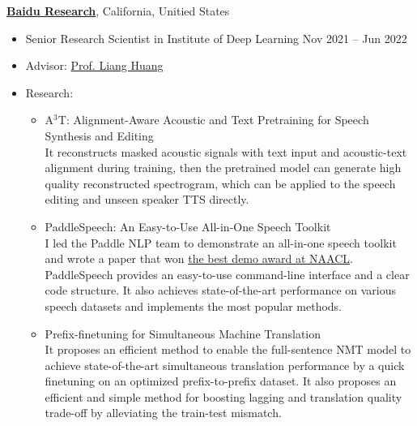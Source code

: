 {\bf \href{http://research.baidu.com/}{Baidu Research}}, California, Unitied States
\begin{itemize}
    \item[] Senior Research Scientist in Institute of Deep Learning \hfill Nov 2021 -- Jun 2022
    \item[] Advisor: \href{https://web.engr.oregonstate.edu/~huanlian/}{Prof. Liang Huang}
    \item[] Research:
    \begin{itemize}
        \item A$^3$T: Alignment-Aware Acoustic and Text Pretraining for Speech Synthesis and Editing~\cite{tmp-a3t} \\
            It reconstructs masked acoustic signals with text input and acoustic-text alignment during training, then the pretrained model can generate high quality reconstructed spectrogram, which can be applied to the speech editing and unseen speaker TTS directly.
        \item PaddleSpeech: An Easy-to-Use All-in-One Speech Toolkit~\cite{tmp-paddlespeech} \\
            I led the Paddle NLP team to demonstrate an all-in-one speech toolkit and wrote a paper that won \href{https://2022.naacl.org/blog/best-demo-award/}{the best demo award at NAACL}. PaddleSpeech provides an easy-to-use command-line interface and a clear code structure. It also achieves state-of-the-art performance on various speech datasets and implements the most popular methods.
        \item Prefix-finetuning for Simultaneous Machine Translation \\
            It proposes an efficient method to enable the full-sentence NMT model to achieve state-of-the-art simultaneous translation performance by a quick finetuning on an optimized prefix-to-prefix dataset.
            It also proposes an efficient and simple method for boosting lagging and translation quality trade-off by alleviating the train-test mismatch.
    \end{itemize}
\end{itemize}

